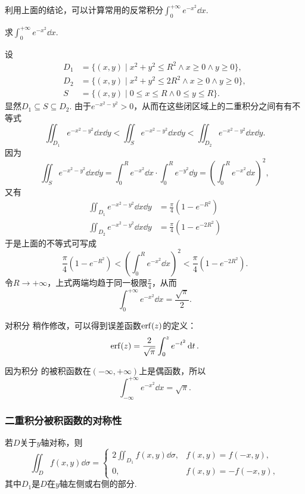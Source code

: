 利用上面的结论，可以计算常用的反常积分\(\int_0^{+\infty} e^{-x^2} \dd{x}\).
\begin{example}
求\(\int_0^{+\infty} e^{-x^2} \dd{x}\).
\begin{solution}
设\begin{align*}
D_1 &= \{ (x,y) \mid x^2+y^2 \leq R^2 \land x \geq 0 \land y \geq 0 \}, \\
D_2 &= \{ (x,y) \mid x^2+y^2 \leq 2 R^2 \land x \geq 0 \land y \geq 0 \}, \\
S &= \{ (x,y) \mid 0 \leq x \leq R \land 0 \leq y \leq R \}.
\end{align*}显然\(D_1 \subseteq S \subseteq D_2\).
由于\(e^{-x^2-y^2} > 0\)，从而在这些闭区域上的二重积分之间有有不等式\[
\iint_{D_1} e^{-x^2-y^2}\dd{x}\dd{y}
< \iint_{S} e^{-x^2-y^2}\dd{x}\dd{y}
< \iint_{D_2} e^{-x^2-y^2}\dd{x}\dd{y}.
\]因为\[
\iint_{S}{e^{-x^2-y^2}\dd{x}\dd{y}}
= \int_0^R e^{-x^2}\dd{x} \cdot \int_0^R e^{-y^2} \dd{y}
= \left( \int_0^R e^{-x^2} \dd{x} \right)^2,
\]又有\begin{align*}
\iint_{D_1}{e^{-x^2-y^2}\dd{x}\dd{y}}
&= \frac{\pi}{4} (1 - e^{-R^2}) \\
\iint_{D_2}{e^{-x^2-y^2}\dd{x}\dd{y}}
&= \frac{\pi}{4} (1 - e^{-2 R^2})
\end{align*}于是上面的不等式可写成\[
\frac{\pi}{4} (1 - e^{-R^2})
< \left( \int_0^R e^{-x^2} \dd{x} \right)^2
< \frac{\pi}{4} (1 - e^{-2 R^2}).
\]令\(R \to +\infty\)，上式两端均趋于同一极限\(\frac{\pi}{4}\)，从而
\begin{equation}\label{equation:重积分.常用积分1}
\int_0^{+\infty} e^{-x^2} \dd{x} = \frac{\sqrt{\pi}}{2}.
\end{equation}
\end{solution}
\end{example}
对积分  稍作修改，可以得到误差函数\(\erf(z)\)的定义：
\begin{equation}
\erf(z) = \frac{2}{\sqrt{\pi}} \int_0^z e^{-t^2} \dd{t}.
\end{equation}

因为积分  的被积函数在\((-\infty,+\infty)\)上是偶函数，所以\begin{equation}\label{equation:重积分.常用积分2}
\int_{-\infty}^{+\infty} e^{-x^2} \dd{x} = \sqrt{\pi}.
\end{equation}

\subsubsection{二重积分被积函数的对称性}
\begingroup
\def\intx#1{\iint_{#1} f(x,y) \dd{\sigma}}
若\(D\)关于\(y\)轴对称，则\[
\intx{D} = \left\{ \begin{array}{cc}
2 \intx{D_1}, & f(x,y) = f(-x,y), \\
0, & f(x,y) = -f(-x,y),
\end{array} \right.
\]其中\(D_1\)是\(D\)在\(y\)轴左侧或右侧的部分.

